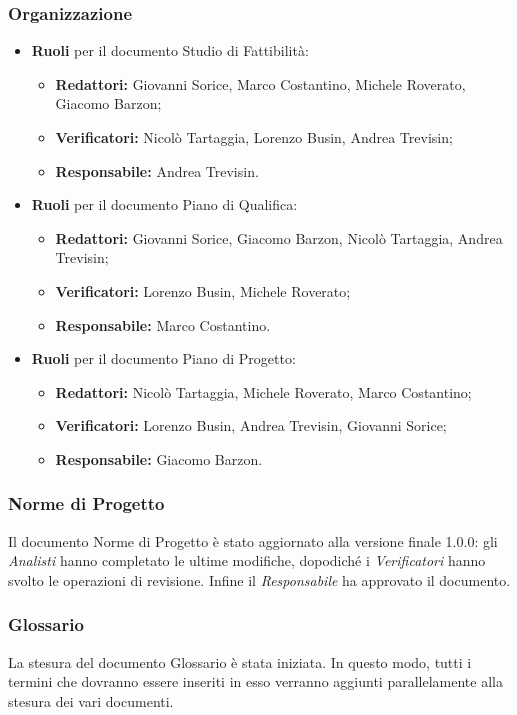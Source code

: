 \subsubsection{Organizzazione}
\begin{itemize}

	\item { \textbf{Ruoli} per il documento Studio di Fattibilità:} 
	\begin{itemize}
		\item { \textbf{Redattori:} Giovanni Sorice, Marco Costantino, Michele Roverato, Giacomo Barzon;}
		\item { \textbf{Verificatori:} Nicolò Tartaggia, Lorenzo Busin, Andrea Trevisin;}
		\item { \textbf{Responsabile:} Andrea Trevisin.} 
	\end{itemize}
	
	\item { \textbf{Ruoli} per il documento Piano di Qualifica:} 
	\begin{itemize}
		\item { \textbf{Redattori:} Giovanni Sorice, Giacomo Barzon, Nicolò Tartaggia, Andrea Trevisin;}
		\item { \textbf{Verificatori:} Lorenzo Busin, Michele Roverato;}
		\item { \textbf{Responsabile:} Marco Costantino.}
	\end{itemize}

\item { \textbf{Ruoli} per il documento Piano di Progetto:} 
	\begin{itemize}
		\item { \textbf{Redattori:} Nicolò Tartaggia, Michele Roverato, Marco Costantino;}
		\item { \textbf{Verificatori:} Lorenzo Busin, Andrea Trevisin, Giovanni Sorice;}
		\item { \textbf{Responsabile:} Giacomo Barzon.}
	\end{itemize}
\end{itemize}

\subsubsection{Norme di Progetto}
Il documento Norme di Progetto è stato aggiornato alla versione finale 1.0.0: gli \emph{Analisti} hanno completato le ultime modifiche, dopodiché i \emph{Verificatori} hanno svolto le operazioni di revisione. Infine il \emph{Responsabile} ha approvato il documento.

\subsubsection{Glossario}
La stesura del documento Glossario è stata iniziata. In questo modo, tutti i termini che dovranno essere inseriti in esso verranno aggiunti parallelamente alla stesura dei vari documenti. 